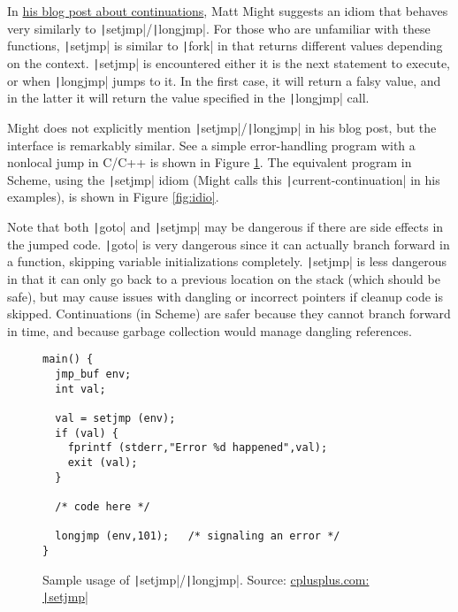 \documentclass[]{article}
\begin{document}
In \href{https://matt.might.net/articles/programming-with-continuations--exceptions-backtracking-search-threads-generators-coroutines/}{his blog post about continuations}, Matt Might suggests an idiom that behaves very similarly to \texttt|setjmp|/\texttt|longjmp|. For those who are unfamiliar with these functions, \texttt|setjmp| is similar to \texttt|fork| in that returns different values depending on the context. \texttt|setjmp| is encountered either it is the next statement to execute, or when \texttt|longjmp| jumps to it. In the first case, it will return a falsy value, and in the latter it will return the value specified in the \texttt|longjmp| call.

Might does not explicitly mention \texttt|setjmp|/\texttt|longjmp| in his blog post, but the interface is remarkably similar. See a simple error-handling program with a nonlocal jump in C/C++ is shown in Figure \ref{fig:setj}. The equivalent program in Scheme, using the \texttt|setjmp| idiom (Might calls this \texttt|current-continuation| in his examples), is shown in Figure \ref{fig:idio}.

Note that both \texttt|goto| and \texttt|setjmp| may be dangerous if there are side effects in the jumped code. \texttt|goto| is very dangerous since it can actually branch forward in a function, skipping variable initializations completely. \texttt|setjmp| is less dangerous in that it can only go back to a previous location on the stack (which should be safe), but may cause issues with dangling or incorrect pointers if cleanup code is skipped. Continuations (in Scheme) are safer because they cannot branch forward in time, and because garbage collection would manage dangling references.

\begin{figure}[]
  \centering
\begin{verbatim}
main() {
  jmp_buf env;
  int val;

  val = setjmp (env);
  if (val) {
    fprintf (stderr,"Error %d happened",val);
    exit (val);
  }

  /* code here */

  longjmp (env,101);   /* signaling an error */
}
\end{verbatim}
  \caption{Sample usage of \texttt|setjmp|/\texttt|longjmp|. Source: \href{http://www.cplusplus.com/reference/csetjmp/setjmp/}{cplusplus.com: \texttt|setjmp|}}
  \label{fig:setj}
\end{figure}
\end{document}
